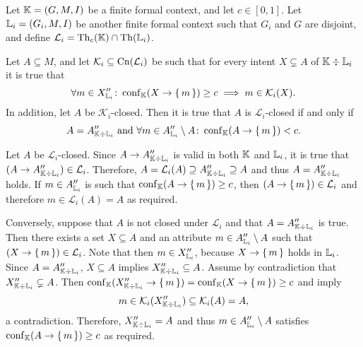 \begin{Proposition}
  \label{prop:easy-checking-confidence-closed}
  Let ${\mathbb{K}} = (G, M, I)$ be a finite formal context, and let $c \in [0,1]$.  Let ${\mathbb{L}}_{i} = (G_{i}, M, I)$ be another finite formal context such that $G_{i}$ and $G$ are
  disjoint, and define $\mathcal{L}_{i} = \operatorname{Th}_{c}({\mathbb{K}}) \cap \operatorname{Th}({\mathbb{L}}_{i})$.

  Let $A \subseteq M$, and let $\mathcal{K}_{i} \subseteq \operatorname{Cn}(\mathcal{L}_{i})$ be such
  that for every intent $X \subsetneq A$ of ${\mathbb{K}} \div {\ensuremath{\mathbb{L}}}_{i}$ it is true that
  \begin{equation}
    \label{eq:44}
    \forall m \in X_{{\mathbb{L}}_{i}}'' \colon \operatorname{conf}_{{\mathbb{K}}}(X \to {\ensuremath{\{\,m\,\}}}) \ge c \implies m
    \in \mathcal{K}_{i}(X).
  \end{equation}
  In addition, let $A$ be $\mathcal{K}_{i}$-closed.  Then it is true that $A$ is
  $\mathcal{L}_{i}$-closed if and only if
  \begin{equation}
    \label{eq:45}
    A = A_{{\mathbb{K}} \div {\ensuremath{\mathbb{L}}}_{i}}'' \text{ and } \forall m \in A_{{\mathbb{L}}_{i}}'' \setminus
    A \colon \operatorname{conf}_{{\mathbb{K}}}(A \to {\ensuremath{\{\,m\,\}}}) < c.
  \end{equation}
\end{Proposition}
\begin{Proof}
  Let $A$ be $\mathcal{L}_{i}$-closed.  Since $A \to A_{{\mathbb{K}} \div {\ensuremath{\mathbb{L}}}_{i}}''$ is
  valid in both ${\mathbb{K}}$ and ${\mathbb{L}}_{i}$, it is true that $(A \to A_{{\mathbb{K}} \div {\ensuremath{\mathbb{L}}}_{i}}'') \in \mathcal{L}_{i}$.  Therefore, $A = \mathcal{L}_{i}(A) \supseteq A_{{\mathbb{K}} \div {\ensuremath{\mathbb{L}}}_{i}}'' \supseteq A$ and thus $A = A_{{\mathbb{K}} \div {\ensuremath{\mathbb{L}}}_{i}}''$ holds.
  If $m \in A_{{\mathbb{L}}_{i}}''$ is such that $\operatorname{conf}_{{\mathbb{K}}}(A \to {\ensuremath{\{\,m\,\}}}) \ge c$, then $(A
  \to {\ensuremath{\{\,m\,\}}}) \in \mathcal{L}_{i}$ and therefore $m \in \mathcal{L}_{i}(A) = A$ as
  required.

  Conversely, suppose that $A$ is not closed under $\mathcal{L}_{i}$ and that $A = A_{{\mathbb{K}} \div {\ensuremath{\mathbb{L}}}_{i}}''$ is true.  Then there exists a set $X \subseteq A$ and an
  attribute $m \in A_{{\mathbb{L}}_{i}}'' \setminus A$ such that $(X \to {\ensuremath{\{\,m\,\}}}) \in
  \mathcal{L}_{i}$.  Note that then $m \in X_{{\mathbb{L}}_{i}}''$, because $X \to {\ensuremath{\{\,m\,\}}}$
  holds in ${\mathbb{L}}_{i}$.  Since $A = A_{{\mathbb{K}} \div {\ensuremath{\mathbb{L}}}_{i}}''$, $X \subseteq A$
  implies $X_{{\mathbb{K}} \div {\ensuremath{\mathbb{L}}}_{i}}'' \subseteq A$.  Assume by contradiction that
  $X_{{\mathbb{K}} \div {\ensuremath{\mathbb{L}}}_{i}}'' \subsetneq A$.  Then $\operatorname{conf}_{{\mathbb{K}}}(X_{{\mathbb{K}} \div {\ensuremath{\mathbb{L}}}_{i}}'' \to {\ensuremath{\{\,m\,\}}}) = \operatorname{conf}_{{\mathbb{K}}}(X \to {\ensuremath{\{\,m\,\}}}) \ge c$ and  imply
  \begin{equation*}
    m \in \mathcal{K}_{i}(X_{{\mathbb{K}} \div {\ensuremath{\mathbb{L}}}_{i}}'') \subseteq \mathcal{K}_{i}(A) = A,
  \end{equation*}
  a contradiction.  Therefore, $X_{{\mathbb{K}} \div {\ensuremath{\mathbb{L}}}_{i}}'' = A$ and thus $m \in A_{{\mathbb{L}}_{i}}'' \setminus A$ satisfies $\operatorname{conf}_{{\mathbb{K}}}(A \to {\ensuremath{\{\,m\,\}}}) \ge c$ as required.
\end{Proof}

